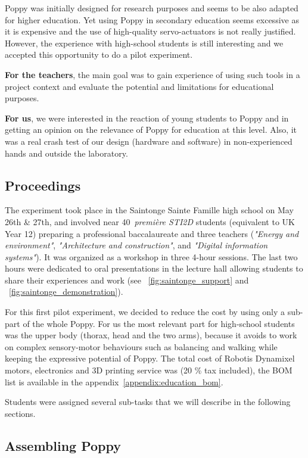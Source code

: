 Poppy was initially designed for research purposes and seems to be also adapted for higher education. Yet using Poppy in secondary education seems excessive as it is expensive and the use of high-quality servo-actuators is not really justified. However, the experience with high-school students is still interesting and we accepted this opportunity to do a pilot experiment.

\textbf{For the teachers}, the main goal was to gain experience of using such tools in a project context and evaluate the potential and limitations for educational purposes.

\textbf{For us}, we were interested in the reaction of young students to Poppy and in getting an opinion on the relevance of Poppy for education at this level. Also, it was a real crash test of our design (hardware and software) in non-experienced hands and outside the laboratory.

\subsection{Proceedings} %

The experiment took place in the Saintonge Sainte Famille high school on May 26th \& 27th, and involved near 40~\emph{première STI2D} students (equivalent to UK Year 12) preparing a professional baccalaureate and three teachers (\emph{"Energy and environment"}, \emph{"Architecture and construction"}, and \emph{"Digital information systems"}).
It was organized as a workshop in three 4-hour sessions. The last two hours were dedicated to oral presentations in the lecture hall allowing students to share their experiences and work (see \figurename~\ref{fig:saintonge_support} and \figurename~\ref{fig:saintonge_demonstration}).

For this first pilot experiment, we decided to reduce the cost by using only a sub-part of the whole Poppy. For us the most relevant part for high-school students was the upper body (thorax, head and the two arms), because it avoids to work on complex sensory-motor behaviours such as balancing and walking while keeping the expressive potential of Poppy. The total cost of Robotis Dynamixel motors, electronics and 3D printing service was  (20 \% tax included), the BOM list is available in the appendix~\ref{appendix:education_bom}.


Students were assigned several sub-tasks that we will describe in the following sections.


\subsection{Assembling Poppy} %

